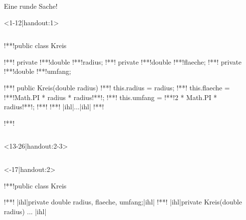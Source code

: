 \begin{frame}[c,fragile]{Eine runde Sache!}
\begin{onlyenv}<1-12|handout:1>
\begin{columns}[c,onlytextwidth]
\footnotesize{}\medskip\par
{}
\SetupLstHl
\begin{plainjava}
!**!public class Kreis {
!**!   private !**!double !**!radius;
!**!   private !**!double !**!flaeche;
!**!   private !**!double !**!umfang;

!**!   public Kreis(double radius) {
!**!       this.radius = radius;
!**!       this.flaeche = !**!Math.PI * radius * radius!**!;
!**!       this.umfang = !**!2 * Math.PI * radius!**!;
!**!   }
!**!   |ihl|...|ihl|
!**!}!**!
\end{plainjava}
\end{columns}
\end{onlyenv}
\begin{onlyenv}<13-26|handout:2-3>
\begin{columns}[c,onlytextwidth]
\footnotesize{}\medskip\par
{}
\SetupLstHl
\begin{onlyenv}<-17|handout:2>
\begin{plainjava}
!**!public class Kreis {
!**!   |ihl|private double radius, flaeche, umfang;|ihl|
!**!   |ihl|private Kreis(double radius)  { ... }|ihl|

}
\end{plainjava}
\end{onlyenv}
\end{columns}
\end{onlyenv}
\end{frame}
